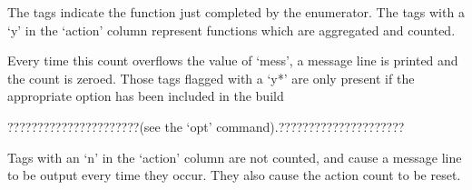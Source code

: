 

The tags indicate the function  just completed by the enumerator.  The
tags with a  `y' in the `action' column  represent functions which are
aggregated and counted.

Every time this count overflows the value of `mess', a message line
is printed and the count is zeroed.
Those tags flagged with a `y*' are only present if the appropriate option
has been included in the build 

??????????????????????(see the `opt' command).?????????????????????

Tags with an `n' in the `action' column are not counted, and cause a
message line to be output every time they occur.
They also cause the action count to be reset.

